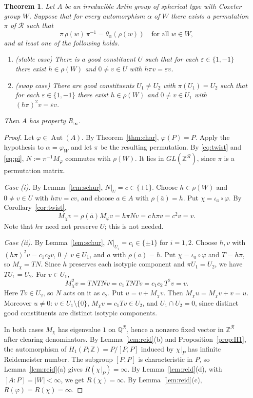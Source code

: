 \documentclass[11pt]{amsart}
\newtheorem{theorem}{Theorem}[section]
\theoremstyle{definition}
\newcommand{\Z}{\mathbb{Z}}
\newcommand{\Q}{\mathbb{Q}}
\newcommand{\R}{\mathcal{R}}
\newcommand{\Aut}{\operatorname{Aut}}
\newcommand{\Rinf}{R_\infty}
\begin{document}
\begin{theorem}\label{thm:crit}
Let $A$ be an irreducible Artin group of spherical type with Coxeter group $W$. Suppose that for every automorphism
$\alpha$ of $W$ there exists a permutation $\pi$ of $\R$ such that
\begin{equation}\label{eq:pi}
\pi\,\rho(w)\,\pi^{-1}=\theta_\alpha(\rho(w))\quad\text{for all }w\in W,
\end{equation}
and at least one of the following holds.
\begin{enumerate}[label=(\roman*)]
\item\emph{(stable case)} There is a good constituent $U$ such that for each $\varepsilon\in\{1,-1\}$ there exist
$h\in\rho(W)$ and $0\ne v\in U$ with $h\pi v=\varepsilon v$.
\item\emph{(swap case)} There are good constituents $U_1\ne U_2$ with $\pi(U_1)=U_2$ such that for each
$\varepsilon\in\{1,-1\}$ there exist $h\in\rho(W)$ and $0\ne v\in U_1$ with $(h\pi)^2v=\varepsilon v$.
\end{enumerate}
Then $A$ has property $\Rinf$.
\end{theorem}

\begin{proof}
Let $\varphi\in\Aut(A)$. By Theorem~\ref{thm:char}, $\varphi(P)=P$. Apply the hypothesis to $\alpha=\varphi_W$ and
let $\pi$ be the resulting permutation. By \eqref{eq:twist} and \eqref{eq:pi}, $N:=\pi^{-1}M_\varphi$ commutes
with $\rho(W)$. It lies in $GL(\Z^\R)$, since $\pi$ is a permutation matrix.

\emph{Case (i).} By Lemma~\ref{lem:schur}, $N|_U=c\in\{\pm1\}$. Choose $h\in\rho(W)$ and $0\ne v\in U$ with
$h\pi v=cv$, and choose $a\in A$ with $\rho(\bar a)=h$. Put $\chi=\iota_a\circ\varphi$. By
Corollary~\ref{cor:twist},
\[M_\chi v=\rho(\bar a)M_\varphi v=h\pi Nv=c\,h\pi v=c^2v=v.\]
Note that $h\pi$ need not preserve $U$; this is not needed.

\emph{Case (ii).} By Lemma~\ref{lem:schur}, $N|_{U_i}=c_i\in\{\pm1\}$ for $i=1,2$. Choose $h,v$ with
$(h\pi)^2v=c_1c_2v$, $0\neq v\in U_1$, and $a$ with $\rho(\bar a)=h$. Put $\chi=\iota_a\circ\varphi$ and $T=h\pi$,
so $M_\chi=TN$. Since $h$ preserves each isotypic component and $\pi U_1=U_2$, we have $TU_1=U_2$. For $v\in U_1$,
\[M_\chi^2v=TNTNv=c_1\,TNTv=c_1c_2\,T^2v=v .\]
Here $Tv\in U_2$, so $N$ acts on it as $c_2$. Put $u=v+M_\chi v$. Then $M_\chi u=M_\chi v+v=u$. Moreover
$u\ne0$: $v\in U_1\setminus\{0\}$, $M_\chi v=c_1Tv\in U_2$, and $U_1\cap U_2=0$, since distinct good constituents
are distinct isotypic components.

In both cases $M_\chi$ has eigenvalue $1$ on $\Q^\R$, hence a nonzero fixed vector in $\Z^\R$ after clearing
denominators. By Lemma~\ref{lem:reid}(b) and Proposition~\ref{prop:H1}, the automorphism of
$H_1(P;\Z)=P/[P,P]$ induced by $\chi|_P$ has infinite Reidemeister number. The subgroup $[P,P]$ is characteristic
in $P$, so Lemma~\ref{lem:reid}(a) gives $R(\chi|_P)=\infty$. By Lemma~\ref{lem:reid}(d), with
$[A:P]=|W|<\infty$, we get $R(\chi)=\infty$. By Lemma~\ref{lem:reid}(c), $R(\varphi)=R(\chi)=\infty$.
\end{proof}
\end{document}
